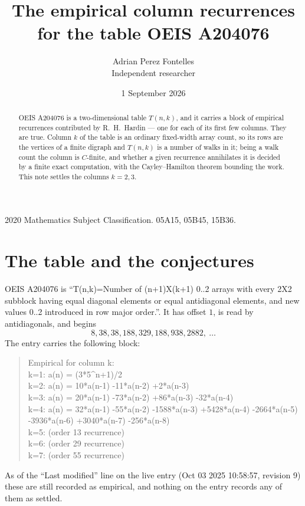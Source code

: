 \documentclass[11pt,a4paper]{article}
\title{The empirical column recurrences for the table OEIS A204076}
\author{Adrian Perez Fontelles\\ \small Independent researcher}
\date{1 September 2026}
\theoremstyle{plain}
\theoremstyle{definition}
\begin{document}
\maketitle

\begin{abstract}
OEIS A204076 is a two-dimensional table $T(n,k)$, and it carries a block of empirical
recurrences contributed by R.~H.~Hardin --- one for each of its first few columns. They are
true. Column $k$ of the table is an ordinary fixed-width array count, so its rows are the
vertices of a finite digraph and $T(n,k)$ is a number of walks in it; being a walk count the
column is $C$-finite, and whether a given recurrence annihilates it is decided by a finite
exact computation, with the Cayley--Hamilton theorem bounding the work. This note settles the columns $k=2, 3$.
\end{abstract}

\noindent\small 2020 Mathematics Subject Classification. 05A15, 05B45, 15B36.\normalsize

\section{The table and the conjectures}

OEIS A204076 is ``T(n,k)=Number of (n+1)X(k+1) 0..2 arrays with every 2X2 subblock having equal diagonal elements or equal antidiagonal elements, and new values 0..2 introduced in row major order.''. It has offset $1$, is
read by antidiagonals, and begins
\[
8, 38, 38, 188, 329, 188, 938, 2882,\ \dots
\]
The entry carries the following block:
\begin{quote}\small
Empirical for column k:\\
k=1: a(n) = (3*5\^{}n+1)/2\\
k=2: a(n) = 10*a(n-1) -11*a(n-2) +2*a(n-3)\\
k=3: a(n) = 20*a(n-1) -73*a(n-2) +86*a(n-3) -32*a(n-4)\\
k=4: a(n) = 32*a(n-1) -55*a(n-2) -1588*a(n-3) +5428*a(n-4) -2664*a(n-5) -3936*a(n-6) +3040*a(n-7) -256*a(n-8)\\
k=5: (order 13 recurrence)\\
k=6: (order 29 recurrence)\\
k=7: (order 55 recurrence)\\
\end{quote}
As of the ``Last modified'' line on the live entry (Oct 03 2025 10:58:57, revision 9) these are still
recorded as empirical, and nothing on the entry records any of them as settled.
\end{document}

